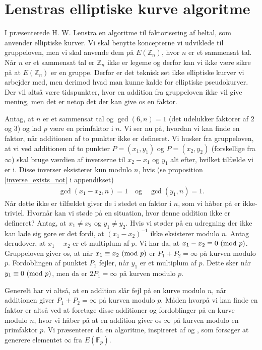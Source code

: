 \section{Lenstras elliptiske kurve algoritme}
I \cite{Lenstra} præsenterede H. W. Lenstra en algoritme til faktorisering af heltal, som anvender elliptiske kurver. Vi skal benytte koncepterne vi udviklede til gruppeloven, men vi skal anvende dem på $E(\mathbb{Z}_n)$, hvor $n$ er et sammensat tal. Når $n$ er et sammensat tal er $\mathbb{Z}_n$ ikke er legeme og derfor kan vi ikke være sikre på at $E(\mathbb{Z}_n)$ er en gruppe. Derfor er det teknisk set ikke elliptiske kurver vi arbejder med, men derimod hvad man kunne kalde for elliptiske pseudokurver. Der vil altså være tidspunkter, hvor en addition fra gruppeloven ikke vil give mening, men det er netop det der kan give os en faktor.

Antag, at $n$ er et sammensat tal og $\gcd(6, n) = 1$ (det udelukker faktorer af $2$ og $3$) og lad $p$ være en primfaktor i $n$. 
Vi ser nu på, hvordan vi kan finde en faktor, når additionen af to punkter ikke er defineret. Vi husker fra gruppeloven, at vi ved additionen af to punkter $P=(x_1, y_1)$ og $P=(x_2, y_2)$ (forskellige fra $\infty$) skal bruge værdien af inverserne til $x_2 - x_1$ og $y_1$ alt efter, hvilket tilfælde vi er i. Disse inverser eksisterer kun modulo $n$, hvis (se proposition \ref{inverse_exists_not} i appendikset)
\begin{align*}
	\gcd(x_1 - x_2, n) = 1 \quad \text{og} \quad \gcd(y_1, n) = 1.
\end{align*}
Når dette ikke er tilfældet giver de i stedet en faktor i $n$, som vi håber på er ikke-triviel.
Hvornår kan vi støde på en situation, hvor denne addition ikke er defineret? Antag, at $x_1 \neq x_2$ og $y_1 \neq y_2$. Hvis vi støder på en udregning der ikke kan lade sig gøre er det fordi, at $(x_1-x_2)^{-1}$ ikke eksisterer modulo $n$. Antag derudover, at $x_1 - x_2$ er et multiplum af $p$. Vi har da, at $x_1 - x_2 \equiv 0 \ (\mathrm{mod} \ p)$. Gruppeloven giver os, at når $x_1 \equiv x_2 \ (\mathrm{mod} \ p)$ er $P_1 + P_2 = \infty$ på kurven modulo $p$.
Fordoblingen af punktet $P_1$ fejler, når $y_1$ er et multiplum af $p$. Dette sker når $y_1 \equiv 0 \ (\mathrm{mod} \ p)$, men da er $2P_1 = \infty$ på kurven modulo $p$.

Generelt har vi altså, at en addition slår fejl på en kurve modulo $n$, når additionen giver $P_1 + P_2 = \infty$ på kurven modulo $p$. Måden hvorpå vi kan finde en faktor er altså ved at foretage disse additioner og fordoblinger på en kurve modulo $n$, hvor vi håber på at en addition giver os $\infty$ på kurven modulo en primfaktor $p$. Vi præsenterer da en algoritme, inspireret af \cite{Silverman} og \cite{Washington}, som forsøger at generere elementet $\infty$ fra $E(\mathbb{F}_p)$.

